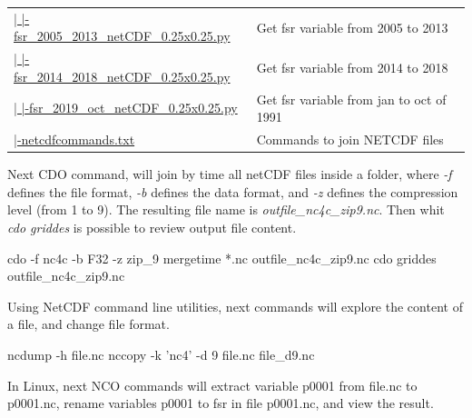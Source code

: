 \documentclass[12pt,oneside]{reedthesis}
\newenvironment{Shaded}{\begin{snugshade}}{\end{snugshade}}
\newcommand{\ExtensionTok}[1]{#1}
\newcommand{\NormalTok}[1]{#1}
\newcommand{\StringTok}[1]{\textcolor[rgb]{0.31,0.60,0.02}{#1}}
\begin{document}
\begin{longtable}[t]{>{\raggedright\arraybackslash}p{2.3in}>{\raggedright\arraybackslash}p{3in}}
\href{ftp://ftp.geocorp.co/windthesis/downloadingEra5/fsr/fsr_2005_2013_netCDF_0.25x0.25.py}{  |    |-fsr\_2005\_2013\_netCDF\_0.25x0.25.py} & Get fsr variable from 2005 to 2013\\
\href{ftp://ftp.geocorp.co/windthesis/downloadingEra5/fsr/fsr_2014_2018_netCDF_0.25x0.25.py}{  |    |-fsr\_2014\_2018\_netCDF\_0.25x0.25.py} & Get fsr variable from 2014 to 2018\\
\href{ftp://ftp.geocorp.co/windthesis/downloadingEra5/fsr/fsr_2019_oct_netCDF_0.25x0.25.py}{  |    |-fsr\_2019\_oct\_netCDF\_0.25x0.25.py} & Get fsr variable from jan to oct of 1991\\
\href{ftp://ftp.geocorp.co/windthesis/downloadingEra5/netcdfcommands.txt}{  |-netcdfcommands.txt} & Commands to join NETCDF files\\
\bottomrule
\end{longtable}
\endgroup{}

Next CDO command, will join by time all netCDF files inside a folder, where \emph{-f} defines the file format, \emph{-b} defines the data format, and \emph{-z} defines the compression level (from 1 to 9). The resulting file name is \emph{outfile\_nc4c\_zip9.nc}. Then whit \emph{cdo griddes} is possible to review output file content.

\scriptsize

\vspace{0.4cm}
\begin{Shaded}
\begin{Highlighting}[]
      \ExtensionTok{cdo}\NormalTok{ -f nc4c -b F32 -z zip_9 mergetime *.nc outfile_nc4c_zip9.nc}
      \ExtensionTok{cdo}\NormalTok{ griddes outfile_nc4c_zip9.nc}
\end{Highlighting}
\end{Shaded}
\normalsize

Using NetCDF command line utilities, next commands will explore the content of a file, and change file format.

\scriptsize

\vspace{0.4cm}
\begin{Shaded}
\begin{Highlighting}[]
      \ExtensionTok{ncdump}\NormalTok{ -h file.nc}
      \ExtensionTok{nccopy}\NormalTok{ -k }\StringTok{'nc4'}\NormalTok{ -d 9 file.nc file_d9.nc}
\end{Highlighting}
\end{Shaded}
\normalsize

In Linux, next NCO commands will extract variable p0001 from file.nc to p0001.nc, rename variables p0001 to fsr in file p0001.nc, and view the result.
\end{document}
